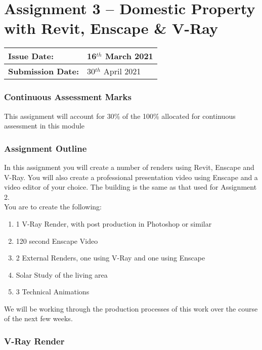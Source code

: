 
	
\part*{Assignment 3 – Domestic Property with  Revit, Enscape \& V-Ray }

\begin{tabularx}{\textwidth}{ |X|X| }
	\hline
	\textbf{Issue Date:} & 16$^{th}$ March 2021 \\
	\hline 
	\textbf{Submission Date:}  & 30$^{th}$ April 2021  \\
	\hline
\end{tabularx}


\section*{Continuous Assessment Marks}
This assignment will account for 30\% of the 100\% allocated for continuous assessment in this module

\section*{Assignment Outline}
In this assignment you will create a number of renders using Revit, Enscape and V-Ray.  You will also create a professional presentation video using Enscape and a video editor of your choice.  The building is the same as that used for Assignment 2. \\

You are to create the following:

\begin{enumerate}
	\item 1 V-Ray Render, with post production in Photoshop or similar
	\item 120 second Enscape Video
	\item 2 External Renders, one using V-Ray and one using Enscape
	\item Solar Study of the living area
	\item 3 Technical Animations
\end{enumerate}

We will be working through the production processes of this work over the course of the next few weeks.\\

\newpage

\section*{V-Ray Render}


